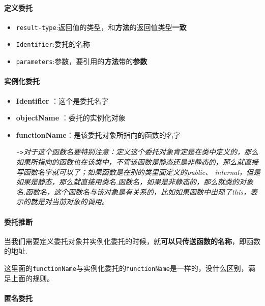 \documentclass[UTF8,a4paper,12pt]{ctexbook}
\begin{document}
 		\paragraph{定义委托} 
 			\begin{itemize}
 				\item \verb|result-type|:返回值的类型，和\textbf{方法}的返回值类型\textbf{一致}
 				\item \verb|Identifier|:委托的名称
 				\item \verb|parameters|:参数，要引用的\textbf{方法}带的\textbf{参数}
 			\end{itemize}
 			
		 
		 \paragraph{实例化委托} 
		 	  \begin{itemize}
		 	  	\item \textbf{Identifier} ：这个是委托名字
		 	  	\item \textbf{objectName} ：委托的实例化对象
		 	  	\item \textbf{functionName}：是该委托对象所指向的函数的名字
		 	  	
		 	  	 \verb|->|\textit{对于这个函数名要特别注意：定义这个委托对象肯定是在类中定义的，那么如果所指向的函数也在该类中，不管该函数是静态还是非静态的，那么就直接写函数名字就可以了；如果函数是在别的类里面定义的public、
		 	  	internal，但是如果是静态，那么就直接用类名.函数名，如果是非静态的，那么就类的对象名.函数名，这个函数名与该对象是有关系的，比如如果函数中出现了this，表示的就是对当前对象的调用。}
		 	  \end{itemize}
		 	 
		 \paragraph{委托推断}
		 
		 	当我们需要定义委托对象并实例化委托的时候，就\textbf{可以只传送函数的名称}，即函数的地址.
		 	
		 	这里面的\verb|functionName|与实例化委托的\verb|functionName|是一样的，没什么区别，满足上面的规则。
		 	
		 \paragraph{匿名委托} 
		 	
\end{document}
